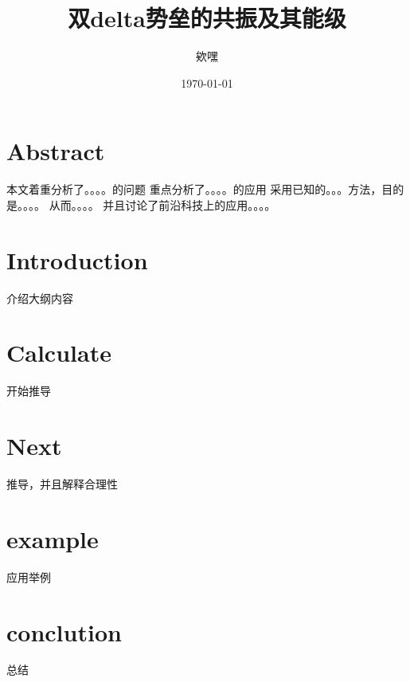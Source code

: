 \documentclass[12pt, a4paper, oneside]{ctexart}
\title{双delta势垒的共振及其能级}
\date{\today}
\author{欸嘿}
\begin{document}
\begin{spacing}{2.0}
\maketitle
\section{Abstract}
本文着重分析了。。。。的问题
重点分析了。。。。的应用
采用已知的。。。方法，目的是。。。。
从而。。。。
并且讨论了前沿科技上的应用。。。。
\section{Introduction}
介绍大纲内容
\section{Calculate}
开始推导
\section{Next}
推导，并且解释合理性
\section{example}
应用举例
\section{conclution}
总结
\end{spacing}
\end{document}
